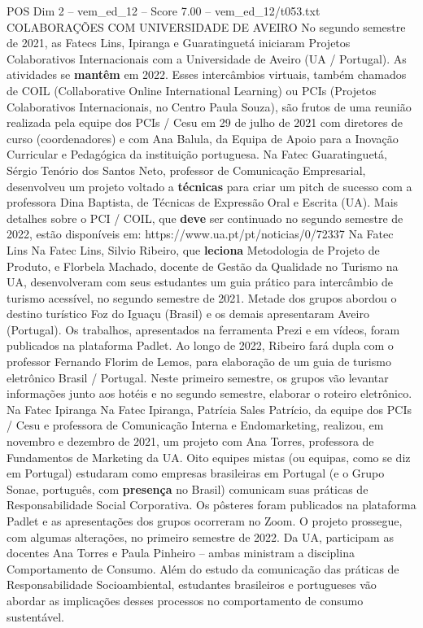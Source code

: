\begin{textsample}{POS Dim 2 – vem\_ed\_12 – Score 7.00 – vem\_ed\_12/t053.txt}  \label{ex:f2_pos_105}
COLABORAÇÕES COM UNIVERSIDADE DE AVEIRO No segundo semestre de 2021, as Fatecs Lins, Ipiranga e Guaratinguetá iniciaram Projetos Colaborativos Internacionais com a Universidade de Aveiro (UA / Portugal).
As atividades se \textbf{mantêm} em 2022.
Esses intercâmbios virtuais, também chamados de COIL (Collaborative Online International Learning) ou PCIs (Projetos Colaborativos Internacionais, no Centro Paula Souza), são frutos de uma reunião realizada pela equipe dos PCIs / Cesu em 29 de julho de 2021 com diretores de curso (coordenadores) e com Ana Balula, da Equipa de Apoio para a Inovação Curricular e Pedagógica da instituição portuguesa.
Na Fatec Guaratinguetá, Sérgio Tenório dos Santos Neto, professor de Comunicação Empresarial, desenvolveu um projeto voltado a \textbf{técnicas} para criar um pitch de sucesso com a professora Dina Baptista, de Técnicas de Expressão Oral e Escrita (UA).
Mais detalhes sobre o PCI / COIL, que \textbf{deve} ser continuado no segundo semestre de 2022, estão disponíveis em: https://www.ua.pt/pt/noticias/0/72337 Na Fatec Lins Na Fatec Lins, Silvio Ribeiro, que \textbf{leciona} Metodologia de Projeto de Produto, e Florbela Machado, docente de Gestão da Qualidade no Turismo na UA, desenvolveram com seus estudantes um guia prático para intercâmbio de turismo acessível, no segundo semestre de 2021.
Metade dos grupos abordou o destino turístico Foz do Iguaçu (Brasil) e os demais apresentaram Aveiro (Portugal).
Os trabalhos, apresentados na ferramenta Prezi e em vídeos, foram publicados na plataforma Padlet.
Ao longo de 2022, Ribeiro fará dupla com o professor Fernando Florim de Lemos, para elaboração de um guia de turismo eletrônico Brasil / Portugal.
Neste primeiro semestre, os grupos vão levantar informações junto aos hotéis e no segundo semestre, elaborar o roteiro eletrônico.
Na Fatec Ipiranga Na Fatec Ipiranga, Patrícia Sales Patrício, da equipe dos PCIs / Cesu e professora de Comunicação Interna e Endomarketing, realizou, em novembro e dezembro de 2021, um projeto com Ana Torres, professora de Fundamentos de Marketing da UA.
Oito equipes mistas (ou equipas, como se diz em Portugal) estudaram como empresas brasileiras em Portugal (e o Grupo Sonae, português, com \textbf{presença} no Brasil) comunicam suas práticas de Responsabilidade Social Corporativa.
Os pôsteres foram publicados na plataforma Padlet e as apresentações dos grupos ocorreram no Zoom.
O projeto prossegue, com algumas alterações, no primeiro semestre de 2022.
Da UA, participam as docentes Ana Torres e Paula Pinheiro – ambas ministram a disciplina Comportamento de Consumo.
Além do estudo da comunicação das práticas de Responsabilidade Socioambiental, estudantes brasileiros e portugueses vão abordar as implicações desses processos no comportamento de consumo sustentável.

\end{textsample}
